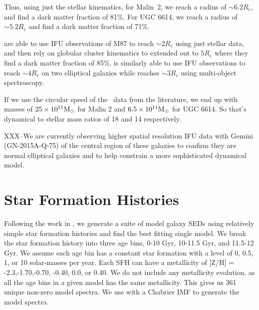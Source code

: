 \documentclass{emulateapj}
\def\arcsec{$^{\prime\prime}$}
\newcommand\msun{\rm{M}_\odot}
\newcommand\HI{\ion{H}{1}}
\begin{document}
Thus, using just the stellar kinematics, for Malin~2, we reach a radius of $\sim 6.2 R_e$, and find a dark matter fraction of 81\%.  For UGC 6614, we reach a radius of  $\sim 5.2 R_e$ and find a dark matter fraction of 71\%.  

\citet{Murphy2011} are able to use IFU observations of M87 to reach $\sim2 R_e$ using just stellar data, and then rely on globular cluster kinematics to extended out to $5 R_e$ where they find a dark matter fraction of 85\%.  \citet{Weij09} is similarly able to use IFU observations to reach $\sim 4 R_e$ on two elliptical galaxies while \citet{Proctor09} reaches $\sim 3 R_e$ using multi-object spectroscopy.  


If we use the circular speed of the \HI\ data from the literature, we end up with masses of $25\times 10^{11} \msun$ for Malin 2 and $6.5\times 10^{11} \msun$ for UGC 6614.  So that's dynamical to stellar mass ratios of 18 and 14 respectively.  %








XXX--We are currently observing higher spatial resolution IFU data with Gemini (GN-2015A-Q-75) of the central region of these galaxies to confirm they are normal elliptical galaxies and to help constrain a more sophisticated dynamical model.

\section{Star Formation Histories}

Following the work in \citet{Yoachim10,Yoachim12}, we generate a suite of model galaxy SEDs using relatively simple star formation histories and find the best fitting single model.  We break the star formation history into three age bins, 0-10 Gyr, 10-11.5 Gyr, and 11.5-12 Gyr.  We assume each age bin has a constant star formation with a level of 0, 0.5, 1, or 10 solar-masses per year.  Each SFH can have a metallicity of [Z/H] = -2.3,-1.70,-0.70, -0.40, 0.0, or  0.40.  We do not include any metallicity evolution, as all the age bins in a given model has the same metallicity.  This gives us 361 unique non-zero model spectra. We use \citet{Bruzual03} with a Chabrier IMF to generate the model spectra. 
  
\end{document}
